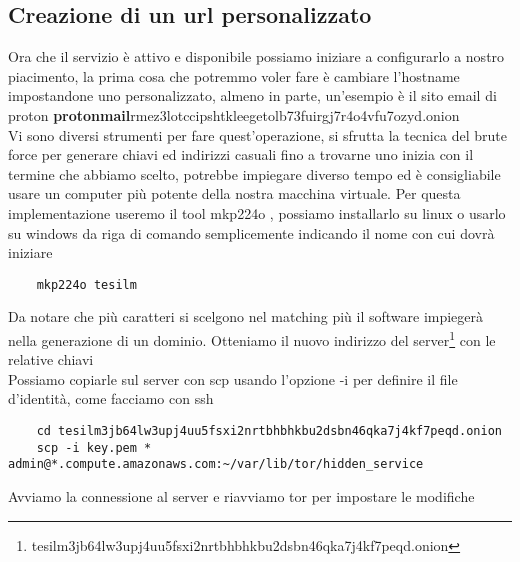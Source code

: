 
\newpage
\subsection{Creazione di un url personalizzato}
Ora che il servizio è attivo e disponibile possiamo iniziare a configurarlo a nostro piacimento, la prima cosa che potremmo voler fare è cambiare l'hostname impostandone uno personalizzato, almeno in parte, un'esempio è il sito email di proton \textbf{protonmail}rmez3lotccipshtkleegetolb73fuirgj7r4o4vfu7ozyd.onion \\
Vi sono diversi strumenti per fare quest'operazione, si sfrutta la tecnica del brute force per generare chiavi ed indirizzi casuali fino a trovarne uno inizia con il termine che abbiamo scelto, potrebbe impiegare diverso tempo ed è consigliabile usare un computer più potente della nostra macchina virtuale. 
Per questa implementazione useremo il tool mkp224o \cite{V3AddressGeneratorRepo}, possiamo installarlo su linux o usarlo su windows da riga di comando semplicemente indicando il nome con cui dovrà iniziare

\begin{lstlisting}
    mkp224o tesilm
\end{lstlisting}
    
Da notare che più caratteri si scelgono nel matching più il software impiegerà nella generazione di un dominio. Otteniamo il nuovo indirizzo del server\footnote{tesilm3jb64lw3upj4uu5fsxi2nrtbhbhkbu2dsbn46qka7j4kf7peqd.onion} con le relative chiavi \\
Possiamo copiarle sul server con scp usando l'opzione -i per definire il file d'identità, come facciamo con ssh
    
\begin{lstlisting}
    cd tesilm3jb64lw3upj4uu5fsxi2nrtbhbhkbu2dsbn46qka7j4kf7peqd.onion
    scp -i key.pem * admin@*.compute.amazonaws.com:~/var/lib/tor/hidden_service
\end{lstlisting}

Avviamo la connessione al server e riavviamo tor per impostare le modifiche



